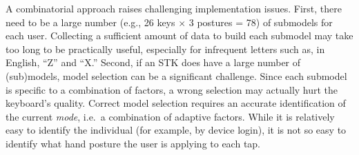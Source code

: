 \documentclass{sigchi}
\begin{document}
A combinatorial approach raises challenging implementation issues. First, there need to be a large number (e.g., 26 keys $\times$ 3 postures = 78) of submodels for each user. Collecting a sufficient amount of data to build each submodel may take too long to be practically useful, especially for infrequent letters such as, in English, ``Z'' and ``X.'' Second, if an STK does have a large number of (sub)models, model selection can be a significant challenge.  Since each submodel is specific to a combination of factors, a wrong selection may actually hurt the keyboard’s quality. Correct model selection requires an accurate identification of the current \textit{mode}, i.e.\ a combination of adaptive factors. While it is relatively easy to identify the individual (for example, by device login), it is not so easy to identify what hand posture the user is applying to each tap. 
\end{document}
